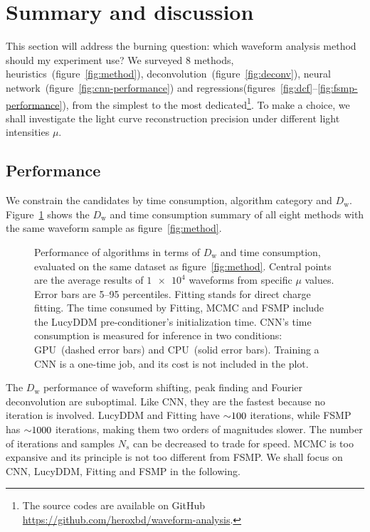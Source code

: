 \section{Summary and discussion}
\label{sec:discussion}

This section will address the burning question: which waveform analysis method should my experiment use?  We surveyed 8 methods, heuristics~(figure~\ref{fig:method}), deconvolution~(figure~\ref{fig:deconv}), neural network~(figure~\ref{fig:cnn-performance}) and regressions(figures~\ref{fig:dcf}--\ref{fig:fsmp-performance}), from the simplest to the most dedicated\footnote{The source codes are available on GitHub \url{https://github.com/heroxbd/waveform-analysis}.}.  To make a choice, we shall investigate the light curve reconstruction precision under different light intensities $\mu$.

\subsection{Performance}

We constrain the candidates by time consumption, algorithm category and $D_\mathrm{w}$.  Figure~\ref{fig:chargesummary} shows the $D_\mathrm{w}$ and time consumption summary of all eight methods with the same waveform sample as figure~\ref{fig:method}.
\begin{figure}[H]
    \centering
    \resizebox{\textwidth}{!}{}
    \caption{\label{fig:chargesummary} Performance of algorithms in terms of $D_\mathrm{w}$ and time consumption, evaluated on the same dataset as figure~\ref{fig:method}. Central points are the average results of $\num[retain-unity-mantissa=false]{1e4}$ waveforms from specific $\mu$ values.  Error bars are 5--95 percentiles.  Fitting stands for direct charge fitting. The time consumed by Fitting, MCMC and FSMP include the LucyDDM pre-conditioner's initialization time.  CNN's time consumption is measured for inference in two conditions: GPU\protect\footnotemark~(dashed error bars) and CPU\protect\footnotemark~(solid error bars).  Training a CNN is a one-time job, and its cost is not included in the plot.}
\end{figure}
\addtocounter{footnote}{-2}

The $D_\mathrm{w}$ performance of waveform shifting, peak finding and Fourier deconvolution are suboptimal.  Like CNN, they are the fastest because no iteration is involved.  LucyDDM and Fitting have $\num{\sim 100}$ iterations, while FSMP has $\num{\sim 1000}$ iterations, making them two orders of magnitudes slower.  The number of iterations and samples $N_s$ can be decreased to trade for speed.  MCMC is too expansive and its principle is not too different from FSMP.  We shall focus on CNN, LucyDDM, Fitting and FSMP in the following.  

